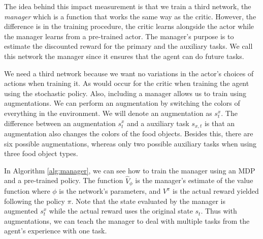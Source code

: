 \documentclass[12pt,A4]{report}
\theoremstyle{definition}
\begin{document}
The idea behind this impact measurement is that we train a third network, the \textit{manager} which is a function that works the same way as the critic. However, the difference is in the training procedure, the critic learns alongside the actor while the manager learns from a pre-trained actor. The manager's purpose is to estimate the discounted reward for the primary and the auxiliary tasks. We call this network the manager since it ensures that the agent can do future tasks.

We need a third network because we want no variations in the actor's choices of actions when training it. As would occur for the critic when training the agent using the stochastic policy. Also, including a manager allows us to train using augmentations. We can perform an augmentation by switching the colors of everything in the environment. We will denote an augmentation as $s^x_t$. The difference between an augmentation $s^x_t$ and a auxiliary task $s_{x,t}$ is that an augmentation also changes the colors of the food objects. Besides this, there are six possible augmentations, whereas only two possible auxiliary tasks when using three food object types. 

In Algorithm \ref{alg:manager}, we can see how to train the manager using an MDP and a pre-trained policy. The function $\hat{V}_\phi$ is the manager's estimate of the value function where $\phi$ is the network's parameters, and $V^\pi$ is the actual reward yielded following the policy $\pi$. Note that the state evaluated by the manager is augmented $s^x_t$ while the actual reward uses the original state $s_t$. Thus with augmentations, we can teach the manager to deal with multiple tasks from the agent's experience with one task.
\end{document}
